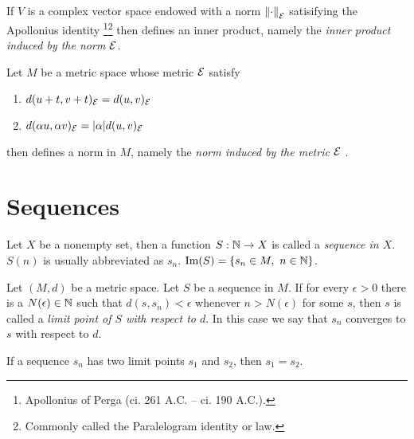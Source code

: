 \documentclass[oneside, 10pt, notitlepage]{book}
\begin{document}
\begin{theorem}
	If \(V\) is a complex vector space endowed with a norm \(\norm{\cdot}_{\mathcal{E}}\) satisifying the Apollonius identity \footnote{Apollonius of Perga  (ci. 261 A.C. – ci. 190 A.C.).}\footnote{Commonly called the Paralelogram identity or law.}
	then
	defines an inner product, namely the \emph{inner product induced by the norm \(\mathcal{E}\)}.
\end{theorem}

\begin{corollary}
	Let \(M\) be a metric space whose metric \(\mathcal{E}\) satisfy
	\begin{enumerate}
		\item \(d(u+t,v+t)_{\mathcal{E}}=d(u,v)_{\mathcal{E}}\)
		\item \(d(\alpha u, \alpha v)_{\mathcal{E}} = \abs{\alpha}d(u,v)_{\mathcal{E}}\)
	\end{enumerate}
	then
	defines a norm in \(M\), namely the \emph{norm induced by the metric \(\mathcal{E}\) }.
\end{corollary}

\section{Sequences}

\begin{definition}[Sequences]
	Let \(X\) be a nonempty set, then a function \(S:\mathbb{N} \to X\) is called a \emph{sequence in \(X\)}. \(S(n)\) is usually abbreviated as \(s_n\). \(\Im(S) = \left\{s_n \in M,\ n\in \mathbb{N}\right\}\).
\end{definition}

\begin{definition}
	Let \((M,d)\) be a metric space. Let \(S\) be a sequence in \(M\). If for every \(\epsilon>0\) there is a \(N(\epsilon)\in \mathbb{N}\) such that \(d(s,s_n)<\epsilon\) whenever \(n>N(\epsilon)\) for some \(s\), then \(s\) is called a \emph{limit point of \(S\) with respect to \(d\)}. In this case we say that \(s_n\) converges to \(s\) with respect to \(d\).
\end{definition}

\begin{proposition}
	If a sequence \(s_n\) has two limit points \(s_1\) and \(s_2\), then \(s_1 = s_2\).
\end{proposition}
\end{document}
